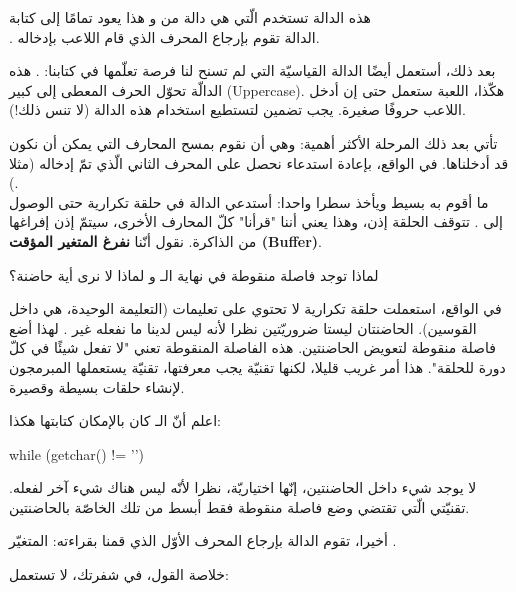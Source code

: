 هذه الدالة تستخدم
الّتي هي دالة من
و هذا يعود تمامًا إلى كتابة\\
.
الدالة
تقوم بإرجاع المحرف الذي قام اللاعب بإدخاله.

بعد ذلك، أستعمل أيضًا الدالة القياسيّة التي لم تسنح لنا فرصة تعلّمها في كتابنا:
.
هذه الدالّة تحوّل الحرف المعطى إلى كبير
(\textenglish{Uppercase}).
هكّذا، اللعبة ستعمل حتى إن أدخل اللاعب حروفًا صغيرة. يجب تضمين
لتستطيع استخدام هذه الدالة (لا تنس ذلك!).

تأتي بعد ذلك المرحلة الأكثر أهمية: وهي أن نقوم بمسح المحارف التي يمكن أن نكون قد أدخلناها. في الواقع، بإعادة استدعاء
نحصل على المحرف الثاني الّذي تمّ إدخاله (مثلا
).\\
ما أقوم به بسيط ويأخذ سطرا واحدا: أستدعي الدالة
في حلقة تكرارية حتى الوصول إلى
.
تتوقف الحلقة إذن، وهذا يعني أننا "قرأنا" كلّ المحارف الأخرى، سيتمّ إذن إفراغها من الذاكرة. نقول أنّنا
\textbf{نفرغ المتغير المؤقت
(\textenglish{Buffer})}.

\begin{question}
لماذا توجد فاصلة منقوطة في نهاية الـ
و لماذا لا نرى أية حاضنة؟
\end{question}

في الواقع، استعملت حلقة تكرارية لا تحتوي على تعليمات (التعليمة الوحيدة، هي
داخل القوسين). الحاضنتان ليستا ضروريّتين نظرا لأنه ليس لدينا ما نفعله غير
.
لهذا أضع فاصلة منقوطة لتعويض الحاضنتين. هذه الفاصلة المنقوطة تعني "لا تفعل شيئًا في كلّ دورة للحلقة". هذا أمر غريب قليلا، لكنها تقنيّة يجب معرفتها، تقنيّة يستعملها المبرمجون لإنشاء حلقات بسيطة وقصيرة.

اعلم أنّ الـ
كان بالإمكان كتابتها هكذا:

\begin{Csource}
while (getchar() != '\n')
{

}
\end{Csource}

لا يوجد شيء داخل الحاضنتين، إنّها اختياريّة، نظرا لأنّه ليس هناك شيء آخر لفعله. تقنيّتي الّتي تقتضي وضع فاصلة منقوطة فقط أبسط من تلك الخاصّة بالحاضنتين.

أخيرا، تقوم الدالة
بإرجاع المحرف الأوّل الذي قمنا بقراءته: المتغيّر
.

خلاصة القول، في شفرتك، لا تستعمل:

